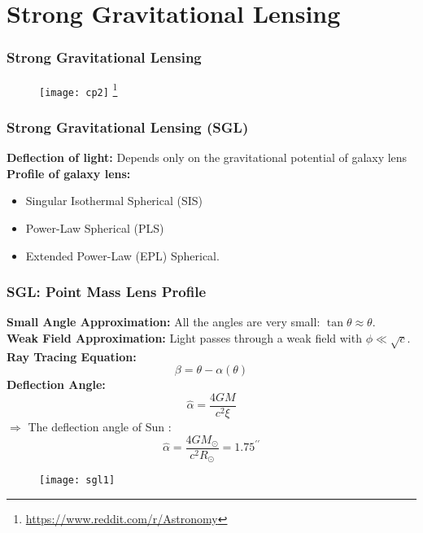 \documentclass[10pt,xcolor={dvipsnames}]{beamer}
\begin{document}
\section{ Strong Gravitational Lensing}
\begin{frame}
 \frametitle{Strong Gravitational Lensing}
\begin{figure}[ht!]
\centering
\texttt{[image: cp2]}
\let\thefootnote\relax\footnote{\url{https://www.reddit.com/r/Astronomy}}
\end{figure} 
 \end{frame}
 \begin{frame}
 \frametitle{Strong Gravitational Lensing (SGL)}
 \textbf{Deflection of light:} Depends only on the gravitational potential of galaxy lens
\vspace{5mm}\\
 \textbf{Profile of galaxy lens:}
\vspace{2mm}\\
\begin{itemize}
\item
Singular Isothermal Spherical (SIS)
\vspace{3mm}\\
\item
Power-Law Spherical (PLS)
\vspace{3mm}\\
\item
Extended Power-Law (EPL) Spherical. 
\end{itemize}
 \end{frame}
\begin{frame}
 \frametitle{\textbf{SGL}: Point Mass Lens Profile}

\begin{minipage}{0.45\textwidth}
 \textbf{Small Angle Approximation: } All the angles are very small: $\tan{{\theta}}\approx{\theta}$.
\vspace{1mm}\\
 \textbf{Weak Field Approximation: }Light passes through a weak field with $\phi\ll\sqrt{c}$.
\vspace{1mm}\\
 \textbf{Ray Tracing Equation:} 
$$\beta=\theta-\alpha(\theta)$$
 \textbf{Deflection Angle:} 
$$
\hat{\alpha}=\dfrac{4 G M}{c^{2} \xi}
$$
$\Rightarrow$ The deflection angle of Sun :
$$
\hat{\alpha}=\dfrac{4 G M_{\odot}}{c^{2} R_{\odot}}=1.75^{\prime \prime}
$$

\end{minipage}%
\hfill
\begin{minipage}{0.55\textwidth}
\begin{figure}[ht!]
\centering
\texttt{[image: sgl1]}
\end{figure} 
\end{minipage}%
 \end{frame}
\end{document}
